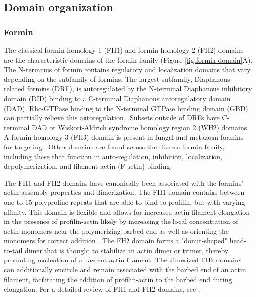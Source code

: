 \subsection{Domain organization}\label{ena-formin-domains}

\subsubsection{Formin}
The classical formin homology 1 (FH1) and formin homology 2 (FH2) domains are the characteristic  domains of the formin family (Figure \ref{fig:formin-domain}A). The N-terminus of formin contains regulatory and localization domains that vary depending on the subfamily of formins. The largest subfamily, Diaphanous-related formins (DRF), is autoregulated by the N-terminal Diaphanous inhibitory domain (DID) binding to a C-terminal Diaphanous autoregulatory domain (DAD).  Rho-GTPase binding to the N-terminal GTPase binding domain (GBD) can partially relieve this autoregulation \citep{higgs_formin_2005}. Subsets outside of DRFs have C-terminal DAD or Wiskott-Aldrich syndrome homology region 2 (WH2) domains. A formin homology 3 (FH3) domain is present in fungal and metazoan formins for targeting \citep{petersen_fh3_1998}. Other domains are found across the diverse formin family, including those that function in auto-regulation, inhibition, localization, depolymerization, and filament actin (F-actin) binding.

The FH1 and FH2 domains have canonically been associated with the formins' actin assembly properties and dimerization. The FH1 domain contains between one to 15 polyproline repeats that are able to bind to profilin, but with varying affinity. This domain is flexible and allows for increased actin filament elongation in the presence of profilin-actin likely by increasing the local concentration of actin monomers near the polymerizing barbed end as well as orienting the monomers for correct addition \citep{romero_formin_2004,goode_mechanism_2007}. The FH2 domain forms a "donut-shaped" head-to-tail dimer that is thought to stabilize an actin dimer or trimer, thereby promoting nucleation of a nascent actin filament. The dimerized FH2 domains can additionally encircle and remain associated with the barbed end of an actin filament, facilitating the addition of profilin-actin to the barbed end during elongation. For a detailed review of FH1 and FH2 domains, see \citep{paul_review_2009}. 

